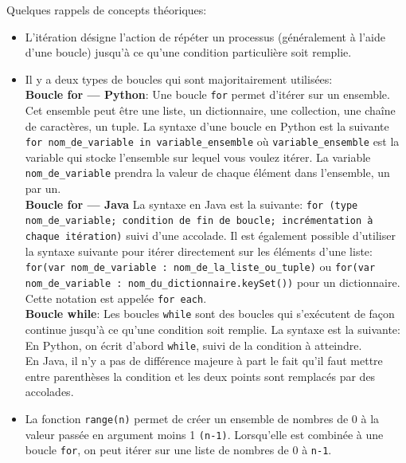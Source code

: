     Quelques rappels de concepts théoriques: \\
    
    \begin{itemize}
    	\item L'itération désigne l'action de répéter un processus (généralement à l'aide d'une boucle) jusqu'à ce qu'une condition particulière soit remplie.
    	\item Il y a deux types de boucles qui sont majoritairement utilisées: \\
    	
    	\textbf{Boucle for — Python}: Une boucle \lstinline{for} permet d'itérer sur un ensemble. Cet ensemble peut être une liste, un dictionnaire, une collection, une chaîne de caractères, un tuple. La syntaxe d'une boucle en Python est la suivante \lstinline{for nom_de_variable in variable_ensemble} où \texttt{variable\_ensemble} est la variable qui stocke l'ensemble sur lequel vous voulez itérer. La variable \texttt{nom\_de\_variable} prendra la valeur de chaque élément dans l'ensemble, un par un. \\
    	
    	
             	
     	\textbf{Boucle for — Java} La syntaxe en Java est la suivante: \lstinline{for (type nom_de_variable; condition de fin de boucle; incrémentation à chaque itération)} suivi d'une accolade. Il est également possible d'utiliser la syntaxe suivante pour itérer directement sur les éléments d'une liste: \lstinline{for(var nom_de_variable : nom_de_la_liste_ou_tuple)} ou \newline \lstinline{for(var nom_de_variable : nom_du_dictionnaire.keySet())} pour un dictionnaire. Cette notation est appelée \texttt{for each}.\\
     	
        	 
        \textbf{Boucle while}: Les boucles \lstinline{while} sont des boucles qui s'exécutent de façon continue jusqu'à ce qu’une condition soit remplie. La syntaxe est la suivante: En Python, on écrit d'abord \lstinline{while}, suivi de la condition à atteindre.\\
     	
     	En Java, il n'y a pas de différence majeure à part le fait qu'il faut mettre entre parenthèses la condition et les deux points sont remplacés par des accolades. \\
     	
     	
     	\item La fonction \lstinline{range(n)} permet de créer un ensemble de nombres de 0 à la valeur passée en argument moins 1 \texttt{(n-1)}. Lorsqu’elle est combinée à une boucle \lstinline{for}, on peut itérer sur une liste de nombres de 0 à \texttt{n-1}. \\
     	

\end{itemize}
